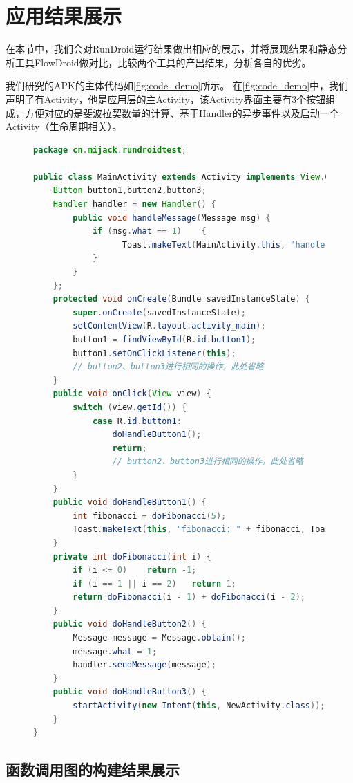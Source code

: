 \section{应用结果展示}  
在本节中，我们会对RunDroid运行结果做出相应的展示，并将展现结果和静态分析工具FlowDroid做对比，比较两个工具的产出结果，分析各自的优劣。

我们研究的APK的主体代码如\autoref{fig:code_demo}所示。
在\autoref{fig:code_demo}中，我们声明了有Activity，他是应用层的主Activity，该Activity界面主要有3个按钮组成，方便对应的是斐波拉契数量的计算、基于Handler的异步事件以及启动一个Activity（生命周期相关）。



\begin{figure}[!h]
	\centering
	\begin{lstlisting}[language=Java]
package cn.mijack.rundroidtest;

public class MainActivity extends Activity implements View.OnClickListener {
	Button button1,button2,button3;
	Handler handler = new Handler() {
		public void handleMessage(Message msg) {
			if (msg.what == 1)    {
			      Toast.makeText(MainActivity.this, "handle", Toast.LENGTH_SHORT).show();
			}
		}
	};
	protected void onCreate(Bundle savedInstanceState) {
		super.onCreate(savedInstanceState);
		setContentView(R.layout.activity_main);
		button1 = findViewById(R.id.button1);
		button1.setOnClickListener(this);  
		// button2、button3进行相同的操作，此处省略
	}
	public void onClick(View view) {
		switch (view.getId()) {
			case R.id.button1:
				doHandleButton1();
				return;				
				// button2、button3进行相同的操作，此处省略
		}
	}
	public void doHandleButton1() {
		int fibonacci = doFibonacci(5);
		Toast.makeText(this, "fibonacci: " + fibonacci, Toast.LENGTH_SHORT).show();
	}
	private int doFibonacci(int i) {
		if (i <= 0)    return -1;   
		if (i == 1 || i == 2)   return 1; 
		return doFibonacci(i - 1) + doFibonacci(i - 2);
	}
	public void doHandleButton2() {
		Message message = Message.obtain();
		message.what = 1;
		handler.sendMessage(message);
	}
	public void doHandleButton3() {
		startActivity(new Intent(this, NewActivity.class));
	}
}\end{lstlisting}
	\caption{}
	\label{fig:code_demo}
\end{figure}



\subsection{函数调用图的构建结果展示}

